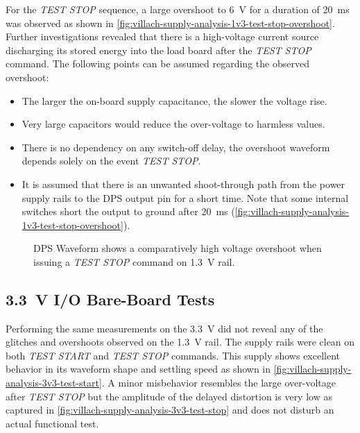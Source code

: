 For the \emph{TEST STOP} sequence, a large overshoot to \SI{6}{\volt} for a
duration of \SI{20}{\milli\second} was observed as shown in
\autoref{fig:villach-supply-analysis-1v3-test-stop-overshoot}.
Further investigations revealed that there is a high-voltage current source
discharging its stored energy into the load board after the \emph{TEST STOP}
command.
The following points can be assumed regarding the observed overshoot:

\begin{itemize}[topsep=8pt,itemsep=4pt,partopsep=4pt, parsep=4pt]

    \item The larger the on-board supply capacitance, the slower the voltage
    rise.

    \item Very large capacitors would reduce the over-voltage to harmless values.

    \item There is no dependency on any switch-off delay, the overshoot waveform
    depends solely on the event \emph{TEST STOP}.

    \item It is assumed that there is an unwanted shoot-through path from the
    power supply rails to the DPS output pin for a short time.
    Note that some internal switches short the output to ground after
    \SI{20}{\milli\second}
    (\autoref{fig:villach-supply-analysis-1v3-test-stop-overshoot}).

\end{itemize}

\begin{figure}[t]
    \centering
    \caption[\SI{1.3}{\volt} Rail overshoot at \emph{TEST STOP}  without
    \acs{DUT}]{
        \ac{DPS} Waveform shows a comparatively high voltage overshoot when
        issuing a \emph{TEST STOP} command on \SI{1.3}{\volt} rail.
    }
    \label{fig:villach-supply-analysis-1v3-test-stop-overshoot}
\end{figure}

\subsection{\SI{3.3}{\volt} \acs{I/O} Bare-Board Tests}
\label{subsec:onsite-measurements-no-dut-3v3}

Performing the same measurements on the \SI{3.3}{\volt} did not reveal any of
the glitches and overshoots observed on the \SI{1.3}{\volt} rail.
The supply rails were clean on both \emph{TEST START} and \emph{TEST STOP}
commands.
This supply shows excellent behavior in its waveform shape and settling speed
as shown in \autoref{fig:villach-supply-analysis-3v3-test-start}.
A minor misbehavior resembles the large over-voltage after \emph{TEST STOP}
but the amplitude of the delayed distortion is very low as captured in
\autoref{fig:villach-supply-analysis-3v3-test-stop} and does not disturb an
actual functional test.

